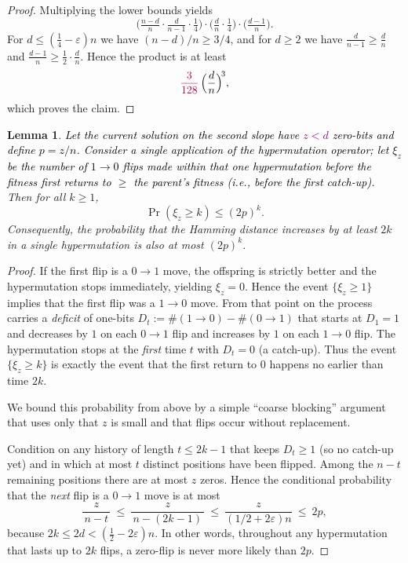 \documentclass[lettersize,journal]{IEEEtran}
\newcommand{\rerev}[1]{\textcolor{purple}{#1}}
\newtheorem{lemma}{Lemma}
\begin{document}
{\begin{proof}
	Multiplying the lower bounds yields
	\[
	\Big(\tfrac{n-d}{n}\cdot\tfrac{d}{n-1}\cdot\tfrac14\Big)\cdot
	\Big(\tfrac{d}{n}\cdot\tfrac14\Big)\cdot
	\Big(\tfrac{d-1}{n}\Big).
	\]
	For $d\le(\tfrac14-\varepsilon)n$ we have $(n-d)/n\ge 3/4$, and for $d\ge 2$ we have $\tfrac{d}{n-1}\ge\tfrac{d}{n}$ and $\tfrac{d-1}{n}\ge \tfrac12\cdot\tfrac{d}{n}$. Hence the product is at least
	\[
	\rerev{\frac{3}{128}}\,\Big(\frac{d}{n}\Big)^{\!3},
	\]
	which proves the claim.
\end{proof}



\setcounter{theorem}{4}
\begin{lemma}%
	\textcolor{black}{Let the current solution on the second slope have \rerev{$z< d$} zero-bits and
	define $p=z/n$.
	Consider a single application of the hypermutation operator; let $\xi_z$ be
	the number of $1\to0$ flips made \emph{within that one hypermutation} before
	the fitness first returns to $\ge$ the parent's fitness (i.e., before the
	first catch-up).}
	Then for all $k\ge1$,
	\[
	\Pr(\xi_z\ge k)\le (2p)^k.
	\]
	Consequently, the probability that the Hamming distance increases by at least 
	$2k$ in a single hypermutation is also at most $(2p)^k$.
\end{lemma}

\begin{proof}
	If the first flip is a $0\!\to 1$ move, the offspring is strictly better and the hypermutation stops immediately, yielding $\xi_z=0$. Hence the event $\{\xi_z\ge 1\}$ implies that the first flip was a $1\!\to 0$ move. From that point on the process carries a \emph{deficit} of one-bits $D_t:=\#(1\!\to 0)-\#(0\!\to 1)$ that starts at $D_1=1$ and decreases by $1$ on each $0\!\to 1$ flip and increases by $1$ on each $1\!\to 0$ flip. The hypermutation stops at the \emph{first} time $t$ with $D_t=0$ (a catch-up). Thus the event $\{\xi_z\ge k\}$ is exactly the event that the first return to $0$ happens no earlier than time $2k$.
	
	We bound this probability from above by a simple ``coarse blocking'' argument that uses only that $z$ is small and that flips occur without replacement.
	
	\smallskip
	Condition on any history of length $t\le 2k-1$ that keeps $D_t\ge 1$ (so no catch-up yet) and in which at most $t$ distinct positions have been flipped. Among the $n-t$ remaining positions there are at most $z$ zeros. Hence the conditional probability that the \emph{next} flip is a $0\!\to 1$ move is at most
	\begin{equation}\label{eq:zero-flip-bound}
	\frac{z}{\,n-t\,}\ \le\ \frac{z}{\,n-(2k-1)\,}\ \le\ \frac{z}{(1/2+2\varepsilon)n}\ \le\ 2p,
	\end{equation}
	because $2k\le 2d<(\tfrac12-2\varepsilon)n$. In other words, throughout any hypermutation that lasts up to $2k$ flips, a zero-flip is never more likely than $2p$.
	

\end{proof}}
\end{document}
